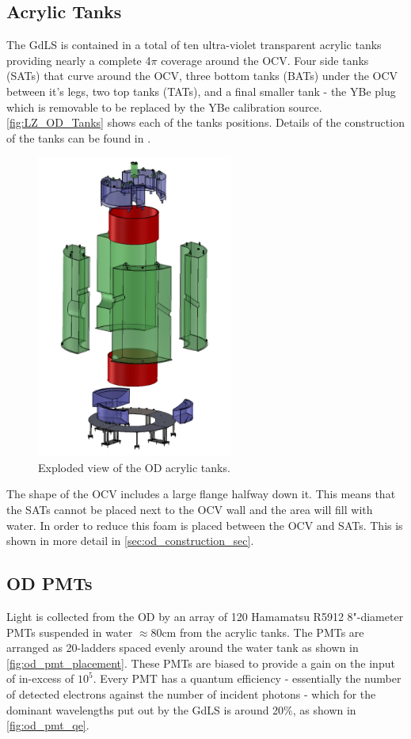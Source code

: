 \subsection{Acrylic Tanks}
\par
The GdLS is contained in a total of ten ultra-violet transparent acrylic tanks providing nearly a complete 4$\pi$ coverage around the OCV.
Four side tanks (SATs) that curve around the OCV, three bottom tanks (BATs) under the OCV between it's legs, two top tanks (TATs), and a final smaller tank - the YBe plug which is removable to be replaced by the YBe calibration source.
\autoref{fig:LZ_OD_Tanks} shows each of the tanks positions.
Details of the construction of the tanks can be found in \cite{scotthaselschwardt_thesis_ref}.
\begin{figure}
    \centering
    \includegraphics[height=10cm]{Figures/LZ/OD_Tanks_CAD.png}
    \caption{Exploded view of the OD acrylic tanks.}
    \label{fig:LZ_OD_Tanks}
\end{figure}

\par
The shape of the OCV includes a large flange halfway down it. 
This means that the SATs cannot be placed next to the OCV wall and the area will fill with water.
In order to reduce this foam is placed between the OCV and SATs.
This is shown in more detail in \autoref{sec:od_construction_sec}.

\subsection{OD PMTs}
\par
Light is collected from the OD by an array of 120 Hamamatsu R5912 8"-diameter PMTs suspended in water $\approx$80cm from the acrylic tanks.
The PMTs are arranged as 20-ladders spaced evenly around the water tank as shown in \autoref{fig:od_pmt_placement}.
These PMTs are biased to provide a gain on the input of in-excess of $10^{5}$.
Every PMT has a quantum efficiency - essentially the number of detected electrons against the number of incident photons - which for the dominant wavelengths put out by the GdLS is around 20\%, as shown in \autoref{fig:od_pmt_qe}.

